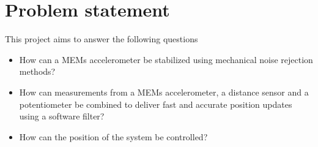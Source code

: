 \section*{Problem statement}
This project aims to answer the following questions
\begin{itemize}
	\item How can a MEMs accelerometer be stabilized using mechanical noise rejection methods?
	\item How can measurements from a MEMs accelerometer, a distance sensor 
		and a potentiometer be combined to deliver fast and accurate position updates
		using a software filter?
	\item How can the position of the system be controlled?
\end{itemize}
